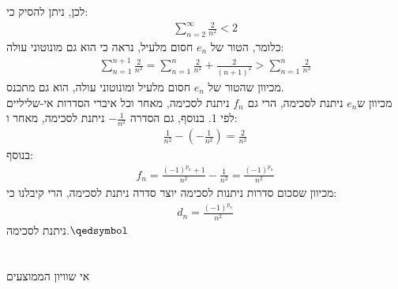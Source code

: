 \documentclass[a4paper, 12pt, leqno]{article}
\newcommand{\sub}[1]{\subsection{\underline{#1}}}
\newcommand{\eq}[1]{\begin{align*}#1\end{align*}}
\renewcommand{\qed}{\hfill\(\qedsymbol\)}
\begin{document}
לכן, ניתן להסיק כי:
\eq{
    \sum^\infty_{n=2}\frac{2}{n^2}<2
}
כלומר, הטור של $e_n$ חסום מלעיל, נראה כי הוא גם מונוטוני עולה:
\eq{
    \sum^{n+1}_{n=1}\frac{2}{n^2}=\sum^{n}_{n=1}\frac{2}{n^2}+\frac{2}{(n+1)^2}>\sum^{n}_{n=1}\frac{2}{n^2}
}
מכיוון שהטור של $e_n$ חסום מלעיל ומונוטוני עולה, הוא גם מתכנס.\\
מכיוון ש$e_n$ ניתנת לסכימה, הרי גם $f_n$ ניתנת לסכימה, מאחר וכל איברי הסדרות אי-שליליים לפי 1.
בנוסף, גם הסדרה $-\frac{1}{n^2}$ ניתנת לסכימה, מאחר ו:
\eq{
    \frac{1}{n^2}-(-\frac{1}{n^2})=\frac{2}{n^2}
}
בנוסף:
\eq{
    f_n=\frac{(-1)^{p_n}+1}{n^2}-\frac{1}{n^2}=\frac{(-1)^{p_n}}{n^2}
}
מכיוון שסכום סדרות ניתנות לסכימה יוצר סדרה ניתנת לסכימה, הרי קיבלנו כי:
\eq{
    d_n=\frac{(-1)^{p_n}}{n^2}
}
ניתנת לסכימה.\qed\setcounter{equation}{0}

\section{}
\sub{}
אי שוויון הממוצעים

\end{document}
